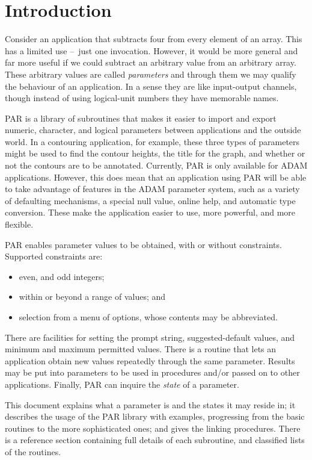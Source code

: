 \documentclass[twoside,11pt,nolof]{starlink}
\providecommand{\dash}{--}
\begin{document}
\scfrontmatter

\section{Introduction}

Consider an application that subtracts four from every element of an
array.  This has a limited use \dash\ just one invocation.  However, it would
be more general and far more useful if we could subtract an arbitrary
value from an arbitrary array.  These arbitrary values are called \emph{parameters\/} and through them we may qualify the behaviour of an
application.  In a sense they are like input-output channels, though
instead of using logical-unit numbers they have memorable names.

PAR is a library of subroutines that makes it easier to import and
export numeric, character, and logical parameters between applications
and the outside world.  In a contouring application, for example, these
three types of parameters might be used to find the contour heights, the
title for the graph, and whether or not the contours are to be
annotated. Currently, PAR is only available for {\footnotesize ADAM}
applications.  However, this does mean that an application using PAR
will be able to take advantage of features in the {\footnotesize ADAM}
parameter system, such as a variety of defaulting mechanisms, a special
null value, online help, and automatic type conversion.  These make the
application easier to use, more powerful, and more flexible.

PAR enables parameter values to be obtained, with or without
constraints.  Supported constraints are:
\begin{itemize}
\item even, and odd integers;
\item within or beyond a range of values; and
\item selection from a menu of options,
whose contents may be abbreviated.
\end{itemize}
There are facilities for setting the prompt string, suggested-default
values, and minimum and maximum permitted values. There is a routine
that lets an application obtain new values repeatedly through the same
parameter.  Results may be put into parameters to be used in procedures
and/or passed on to other applications.  Finally, PAR can inquire the
\emph{state\/} of a parameter.

This document explains what a parameter is and the states it may reside
in; it describes the usage of the PAR library with examples, progressing
from the basic routines to the more sophisticated ones; and gives the
linking procedures.  There is a reference section containing full
details of each subroutine, and classified lists of the routines.
\end{document}
